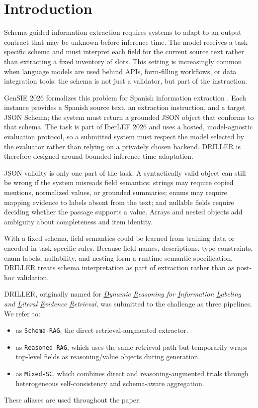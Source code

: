 \section{Introduction}

Schema-guided information extraction requires systems to adapt to an output contract that may be unknown before inference time. The model receives a task-specific schema and must interpret each field for the current source text rather than extracting a fixed inventory of slots. This setting is increasingly common when language models are used behind APIs, form-filling workflows, or data integration tools: the schema is not just a validator, but part of the instruction. \cite{wen2025effectiveefficientschemaawareinformation}

GenSIE 2026 formalizes this problem for Spanish information extraction \cite{gensie2026overview}. Each instance provides a Spanish source text, an extraction instruction, and a target JSON Schema; the system must return a grounded JSON object that conforms to that schema. The task is part of IberLEF 2026 \cite{iberlef2026overview} and uses a hosted, model-agnostic evaluation protocol, so a submitted system must respect the model selected by the evaluator rather than relying on a privately chosen backend. DRILLER is therefore designed around bounded inference-time adaptation.

JSON validity is only one part of the task. A syntactically valid object can still be wrong if the system misreads field semantics: strings may require copied mentions, normalized values, or grounded summaries; enums may require mapping evidence to labels absent from the text; and nullable fields require deciding whether the passage supports a value. Arrays and nested objects add ambiguity about completeness and item identity.

With a fixed schema, field semantics could be learned from training data or encoded in task-specific rules. Because field names, descriptions, type constraints, enum labels, nullability, and nesting form a runtime semantic specification, DRILLER treats schema interpretation as part of extraction rather than as post-hoc validation.

DRILLER, originally named for \textit{\underline{D}ynamic \underline{R}easoning for \underline{I}nformation \underline{L}abeling and \underline{L}iteral \underline{E}vidence \underline{R}etrieval}, was submitted to the challenge as three pipelines. We refer to:
\begin{itemize}
\item {} as \texttt{Schema-RAG}, the direct retrieval-augmented extractor.
\item {} as \texttt{Reasoned-RAG}, which uses the same retrieval path but temporarily wraps top-level fields as reasoning/value objects during generation.
\item {} as \texttt{Mixed-SC}, which combines direct and reasoning-augmented trials through heterogeneous self-consistency and schema-aware aggregation.
\end{itemize}
These aliases are used throughout the paper.

